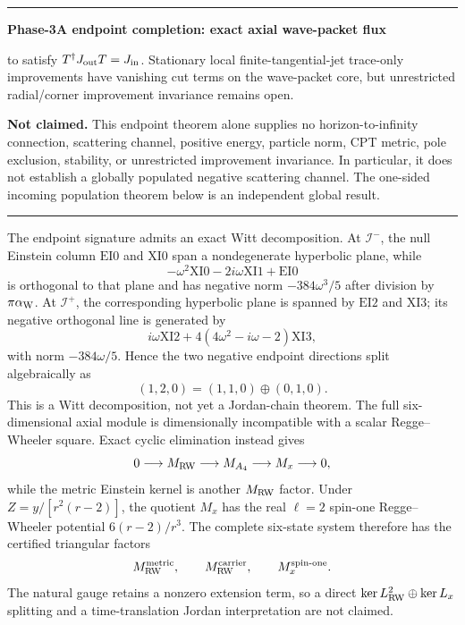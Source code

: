 \documentclass[11pt]{article}
\newenvironment{resultcard}[1]
 {\par\medskip\noindent\hrule\smallskip\noindent\textbf{#1}\par\smallskip}
 {\par\smallskip\hrule\medskip}
\begin{document}
\begin{resultcard}{Phase-3A endpoint completion: exact axial wave-packet flux}
to satisfy \(T^\dagger J_{\rm out}T=J_{\rm in}\).  Stationary local
finite-tangential-jet trace-only improvements have vanishing cut terms on
the wave-packet core, but unrestricted radial/corner improvement invariance
remains open.\par
\textbf{Not claimed.} This endpoint theorem alone supplies no
horizon-to-infinity connection, scattering channel, positive energy,
particle norm, CPT metric, pole exclusion, stability, or unrestricted
improvement invariance.  In particular, it does not establish a globally populated negative scattering
channel.  The one-sided incoming population theorem below is an independent
global result.
\end{resultcard}

The endpoint signature admits an exact Witt decomposition.  At
\(\mathscr I^-\), the null Einstein column \(\mathrm{EI0}\) and
\(\mathrm{XI0}\) span a nondegenerate hyperbolic plane, while
\[
 -\omega^2\mathrm{XI0}-2i\omega\mathrm{XI1}+\mathrm{EI0}
\]
is orthogonal to that plane and has negative norm
\(-384\omega^3/5\) after division by \(\pi\alpha_{\rm W}\).  At
\(\mathscr I^+\), the corresponding hyperbolic plane is spanned by
\(\mathrm{EI2}\) and \(\mathrm{XI3}\); its negative orthogonal line is
generated by
\[
 i\omega\mathrm{XI2}
 +4(4\omega^2-i\omega-2)\mathrm{XI3},
\]
with norm \(-384\omega/5\).  Hence the two negative endpoint directions
split algebraically as
\[
 (1,2,0)=(1,1,0)\oplus(0,1,0).
\]
This is a Witt decomposition, not yet a Jordan-chain theorem.  The full
six-dimensional axial module is dimensionally incompatible with a scalar
Regge--Wheeler square.  Exact cyclic elimination instead gives
\[
 0\longrightarrow M_{\rm RW}
 \longrightarrow M_{A_4}
 \longrightarrow M_x
 \longrightarrow0,
\]
while the metric Einstein kernel is another \(M_{\rm RW}\) factor.  Under
\(Z=y/[r^2(r-2)]\), the quotient \(M_x\) has the real \(\ell=2\)
spin-one Regge--Wheeler potential \(6(r-2)/r^3\).  The complete six-state
system therefore has the certified triangular factors
\[
 M_{\rm RW}^{\rm metric},\qquad
 M_{\rm RW}^{\rm carrier},\qquad
 M_x^{\rm spin\text{-}one}.
\]
The natural gauge retains a nonzero extension term, so a direct
\(\ker L_{\rm RW}^2\oplus\ker L_x\) splitting and a time-translation
Jordan interpretation are not claimed.
\end{document}
